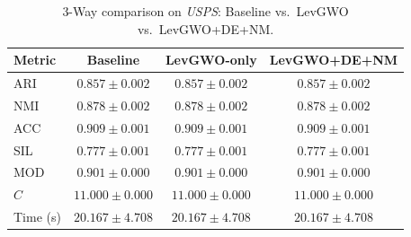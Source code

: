 \begin{table}[htbp]
\centering
\caption{3-Way comparison on \textit{USPS}: Baseline vs.\ LevGWO vs.\ LevGWO+DE+NM.}
\label{tab:usps_3way}
\begin{tabular}{lccc}
\toprule
Metric & Baseline & LevGWO-only & LevGWO+DE+NM \\
\midrule
ARI & $\mathbf{0.857 \pm 0.002}$ & $\mathbf{0.857 \pm 0.002}$ & $\mathbf{0.857 \pm 0.002}$ \\
NMI & $\mathbf{0.878 \pm 0.002}$ & $\mathbf{0.878 \pm 0.002}$ & $\mathbf{0.878 \pm 0.002}$ \\
ACC & $\mathbf{0.909 \pm 0.001}$ & $\mathbf{0.909 \pm 0.001}$ & $\mathbf{0.909 \pm 0.001}$ \\
SIL & $\mathbf{0.777 \pm 0.001}$ & $\mathbf{0.777 \pm 0.001}$ & $\mathbf{0.777 \pm 0.001}$ \\
MOD & $\mathbf{0.901 \pm 0.000}$ & $\mathbf{0.901 \pm 0.000}$ & $\mathbf{0.901 \pm 0.000}$ \\
$C$ & $11.000 \pm 0.000$ & $11.000 \pm 0.000$ & $11.000 \pm 0.000$ \\
Time (s) & $20.167 \pm 4.708$ & $20.167 \pm 4.708$ & $20.167 \pm 4.708$ \\
\bottomrule
\end{tabular}
\end{table}